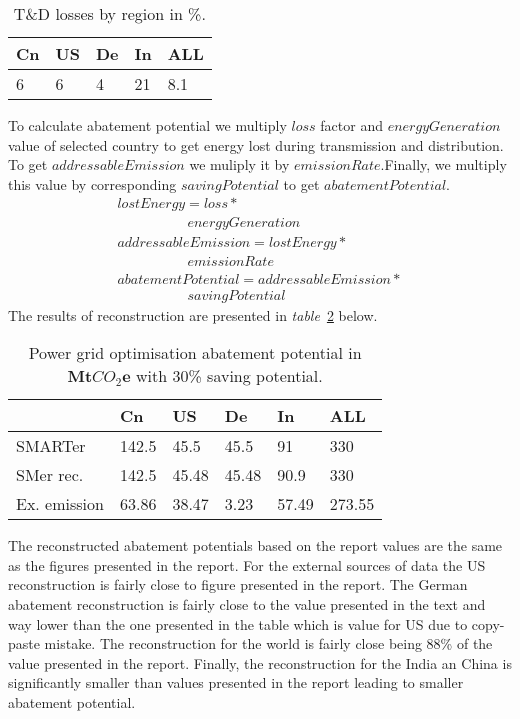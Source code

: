 \documentclass[11pt, twocolumn]{article}
\begin{document}
\begin{center}
  \begin{table}[h]
    \begin{tabular}{ p{} | p{} | p{} | p{} | p{} }
      Cn & US & De & In & ALL \\
      \hline
      6 & 6 & 4 & 21 & 8.1
    \end{tabular}
    \caption{T\&D losses by region in \%. \label{tab:td:bycountry}}
  \end{table}
\end{center}

To calculate abatement potential we multiply $loss$ factor and $energyGeneration$ value of selected country to get energy lost during transmission and distribution. To get $addressableEmission$ we muliply it by $emissionRate$.Finally, we multiply this value by corresponding $savingPotential$ to get $abatementPotential$.
\begin{gather*}
  lostEnergy = loss *\\
  \quad\quad\quad\quad\quad energyGeneration\\
  addressableEmission = lostEnergy *\\
  \quad\quad\quad\quad\quad emissionRate\\
  abatementPotential = addressableEmission *\\
  \quad\quad\quad\quad\quad savingPotential
\end{gather*}
The results of reconstruction are presented in \emph{table}~\ref{tab:pgo} below.
\begin{center}
  \begin{table}[h]
    \begin{tabular}{ p{} | p{} | p{} | p{} | p{} | p{} }
       & Cn & US & De & In & ALL \\
      \hline
      SMARTer & 142.5 & 45.5 & 45.5 & 91 & 330 \\
      SMer rec. & 142.5 & 45.48 & 45.48 & 90.9 & 330 \\
      Ex. emission & 63.86 & 38.47 & 3.23 & 57.49 & 273.55
    \end{tabular}
    \caption{Power grid optimisation abatement potential in $\mathbf{Mt}CO_2\mathbf{e}$ with 30\% saving potential. \label{tab:pgo}}
  \end{table}
\end{center}
The reconstructed abatement potentials based on the report values are the same as the figures presented in the report. For the external sources of data the US reconstruction is fairly close to figure presented in the report. The German abatement reconstruction is fairly close to the value presented in the text and way lower than the one presented in the table which is value for US due to copy-paste mistake. The reconstruction for the world is fairly close being 88\% of the value presented in the report. Finally, the reconstruction for the India an China is significantly smaller than values presented in the report leading to smaller abatement potential.
\end{document}
